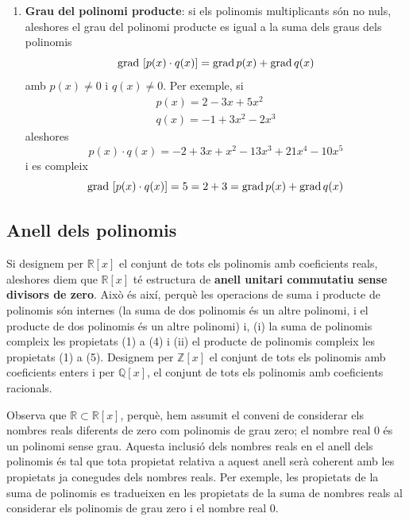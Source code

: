 \begin{enumerate}
\item[(6)] \textbf{Grau del polinomi producte}: si els polinomis
multiplicants són no nuls, aleshores el grau del polinomi producte es
igual a la suma dels graus dels polinomis\begin{equation*}
\text{grad\,}\left[ p(x)\cdot q(x)\right]
=\text{grad\,}p(x)+\text{grad\,}q(x)
\end{equation*}amb $p(x)\neq 0$ i $q(x)\neq 0$. Per exemple, si
\begin{equation*}
\begin{array}{l}
p(x)=2-3x+5x^{2} \\
q(x)=-1+3x^{2}-2x^{3}\end{array}\end{equation*}aleshores\begin{equation*}
p(x)\cdot q(x)=-2+3x+x^{2}-13x^{3}+21x^{4}-10x^{5}
\end{equation*}i es compleix\begin{equation*}
\text{grad\,}\left[ p(x)\cdot q(x)\right]
=5=2+3=\text{grad\,}p(x)+\text{grad\,}q(x)
\end{equation*}
\end{enumerate}

\subsection{Anell dels polinomis}

Si designem per $\mathbb{R}[x]$ el conjunt de tots els polinomis amb
coeficients reals, aleshores diem que $\mathbb{R}[x]$ té estructura
de \textbf{anell unitari commutatiu sense divisors de zero}. Això és així, perquè les operacions de suma i producte de polinomis són internes
(la suma de dos polinomis és un altre polinomi, i el producte de dos
polinomis és un altre polinomi) i, (i) la suma de polinomis compleix les
propietats (1) a (4) i (ii) el producte de polinomis compleix les
propietats (1) a (5). Designem per $\mathbb{Z}[x]$ el conjunt de tots
els polinomis amb coeficients enters i per $\mathbb{Q}[x]$, el conjunt
de tots els polinomis amb coeficients racionals.

Observa que $\mathbb{R}\subset \mathbb{R}[x]$, perquè, hem assumit el
conveni de considerar els nombres reals diferents de zero com
polinomis de grau zero; el nombre real $0$ és un polinomi sense grau.
Aquesta inclusió dels nombres reals en el anell dels polinomis
és tal que tota propietat relativa a aquest anell serà coherent amb
les propietats ja conegudes dels nombres reals. Per exemple, les
propietats de la suma de polinomis es tradueixen en les propietats de la
suma de nombres reals al considerar els polinomis de grau zero i el nombre real $0$.

